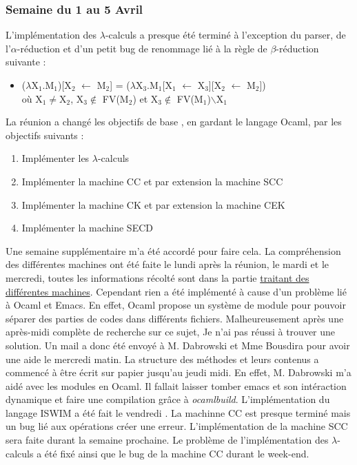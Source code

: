 \documentclass[10pt,a4paper]{article}
\begin{document}
			\subsubsection{Semaine du 1 au 5 Avril}
			L'implémentation des $\lambda$-calculs a presque été terminé à l'exception du parser, de l'$\alpha$-réduction et d'un petit bug de renommage lié à la règle de $\beta$-réduction suivante :
			\smallbreak
			\begin{itemize}
				\item [] ($\lambda$X$_{1}$.M$_{1}$)[X$_{2}$ $\leftarrow$ M$_{2}$] = ($\lambda$X$_{3}$.M$_{1}$[X$_{1}$ $\leftarrow$ X$_{3}$][X$_{2}$ $\leftarrow$ M$_{2}$]) 
				\\où X$_{1}$$\neq$X$_{2}$, X$_{3}$$\notin$ FV(M$_{2}$) 
				et X$_{3}$$\notin$ FV(M$_{1}$)$\backslash${X$_{1}$} 
			\end{itemize}
			La réunion a changé les objectifs de base , en gardant le langage Ocaml, par les objectifs suivants : 
			\begin{enumerate}
				\item Implémenter les $\lambda$-calculs
				\item Implémenter la machine CC et par extension la machine SCC
				\item Implémenter la machine CK et par extension la machine CEK
				\item Implémenter la machine SECD
			\end{enumerate}
			Une semaine supplémentaire m'a été accordé pour faire cela.
			\medbreak
			La compréhension des différentes machines ont été faite le lundi après la réunion, le mardi et le mercredi, toutes les informations récolté sont dans la partie \hyperref[Machine]{traitant des différentes machines}. \smallbreak
			Cependant rien a été implémenté à cause d'un problème lié à Ocaml et Emacs. En effet, Ocaml propose un système de module pour pouvoir séparer des parties de codes dans différents fichiers.
			\smallbreak
			Malheureusement après une après-midi complète de recherche sur ce sujet, Je n'ai pas réussi à trouver une solution. Un mail a donc été envoyé à M. Dabrowski et Mme Bousdira pour avoir une aide le mercredi matin.
			\smallbreak 
			La structure des méthodes et leurs contenus a commencé à être écrit sur papier jusqu'au jeudi midi. En effet, M. Dabrowski m'a aidé avec les modules en Ocaml. Il fallait laisser tomber emacs et son intéraction dynamique et faire une compilation grâce à \textit{ocamlbuild}.
			\smallbreak
			L'implémentation du langage ISWIM a été fait le vendredi . La machinne CC est presque terminé mais un bug lié aux opérations créer une erreur. L'implémentation de la machine SCC sera faite durant la semaine prochaine. Le problème de l'implémentation des $\lambda$-calculs a été fixé ainsi que le bug de la machine CC durant le week-end.
			
\end{document}
